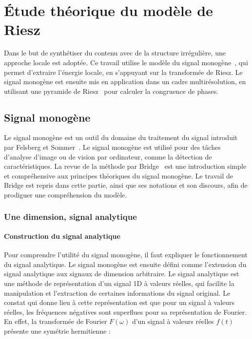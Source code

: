 \chapter{Étude théorique du modèle de Riesz}
\label{ch:chapitre1}

Dans le but de synthétiser du contenu avec de la structure irrégulière, une approche locale est adoptée. Ce travail utilise le modèle du signal monogène~\cite{felsberg_monogenic_2001}, qui permet d'extraire l'énergie locale, en s'appuyant sur la transformée de Riesz. Le signal monogène est ensuite mis en application dans un cadre multirésolution, en utilisant une pyramide de Riesz~\cite{wadhwa_riesz_2014} pour calculer la congruence de phases.

\section{Signal monogène}

Le signal monogène est un outil du domaine du traitement du signal introduit par Felsberg et Sommer~\cite{felsberg_monogenic_2001}. Le signal monogène est utilisé pour des tâches d'analyse d'image ou de vision par ordinateur, comme la détection de caractéristiques. La revue de la méthode par Bridge~\cite{bridge_introduction_2018} est une introduction simple et compréhensive aux principes théoriques du signal monogène. Le travail de Bridge est repris dans cette partie, ainsi que ses notations et son discours, afin de prodiguer une compréhension du modèle.

\subsection{Une dimension, signal analytique}

\subsubsection{Construction du signal analytique}

Pour comprendre l'utilité du signal monogène, il faut expliquer le fonctionnement du signal analytique. Le signal monogène est ensuite défini comme l'extension du signal analytique aux signaux de dimension arbitraire. Le signal analytique est une méthode de représentation d'un signal 1D à valeurs réelles, qui facilite la manipulation et l'extraction de certaines informations du signal original. Le constat qui donne lieu à cette représentation est que pour un signal à valeurs réelles, les fréquences négatives sont superflues pour sa représentation de Fourier. En effet, la transformée de Fourier $F(\omega)$ d'un signal à valeurs réelles $f(t)$ présente une symétrie hermitienne :

